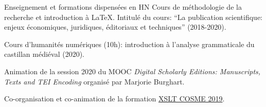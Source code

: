 










\begin{rubric}{Enseignement et formations dispensées en HN}
                                \entry*[]
                            Cours de méthodologie de la recherche et
                        introduction à \LaTeX. Intitulé du cours: \enquote{La
                        publication scientifique: enjeux économiques,
                        juridiques, éditoriaux et techniques} (2018-2020).
                    
                                \hspace{-1cm}
                                \entry*
                            Cours d'humanités numériques (10h): introduction à
                        l'analyse grammaticale du castillan médiéval (2020).
                    
                                \hspace{-1cm}
                                \entry*
                            Animation de la session 2020 du MOOC \textit{Digital
                        Scholarly Editions: Manuscripts, Texts and TEI
                        Encoding} organisé par Marjorie Burghart.
                    
                                \hspace{-1cm}
                                \entry*
                            Co-organisation et co-animation de la formation \href{https://github.com/gabays/Cours\_COSME\_2019}{XSLT
                        COSME 2019}. 
                    \end{rubric}


